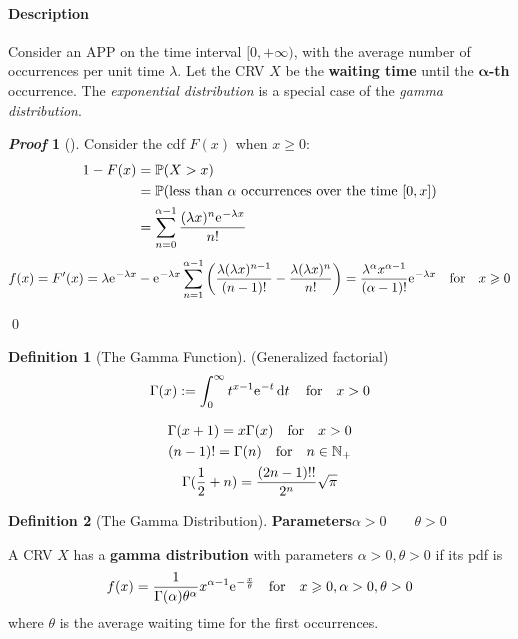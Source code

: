 \documentclass[10pt,UTF8]{article}
\newenvironment{definition box}
{\begin{tcolorbox}[colback=blue!5!white,colframe=blue!75!black,parbox=false,before upper=\par,before lower=\par]}
{\end{tcolorbox}}
\newenvironment{theorem box}
{\begin{tcolorbox}[colback=yellow!5!white,colframe=yellow!75!black,parbox=false,before upper=\par,before lower=\par]}
{\end{tcolorbox}}
\theoremstyle{definition}
\newtheorem{definition inner}{Definition}[section]
\newenvironment{definition}[1][]
{\begin{definition box}\begin{definition inner}[#1]\hfill\par}
{\end{definition inner}\end{definition box}}
\theoremstyle{plain}
\newtheorem{theorem inner}{Theorem}[section]
\theoremstyle{definition}
\newtheorem*{proof inner}{\textit{Proof}}
\renewenvironment{proof}[1][]
{\begin{proof inner}[#1]\hfill\par}
{\qed\end{proof inner}}
\theoremstyle{remark}
\newcommand{\e}{\mathrm{e}{\mkern 1 mu}}
\newcommand{\Prob}{\mathbb{P}\qty}
\begin{document}
\paragraph{Description}
Consider an APP on the time interval $[0,+\infty)$,
with the average number of occurrences per unit time $\lambda$.
Let the CRV $X$ be the \textbf{waiting time}
until the $\bm{\alpha}$\textbf{-th} occurrence.
The \textit{exponential distribution} is a special case of the \textit{gamma distribution}.

\begin{proof}
Consider the cdf $F(x)$ when $x\geqslant 0$:
\begin{align*}
    1 - F(x) &= \Prob(X > x) \\
    &= \Prob(\text{less than $\alpha$ occurrences over the time $[0,x]$}) \\
    &= \sum_{n=0}^{\alpha-1} \frac{(\lambda x)^n \e^{-\lambda x}}{n!}
\end{align*}
\begin{equation*}
    f(x) = F'(x) = 
    \lambda \e^{-\lambda x} -
    \e^{-\lambda x}\sum_{n=1}^{\alpha-1}\left(
        \frac{\lambda(\lambda x)^{n-1}}{(n-1)!} -
        \frac{\lambda(\lambda x)^{n}}{n!}
    \right)
    = \frac{\lambda^\alpha x^{\alpha-1}}{(\alpha-1)!}\e^{-\lambda x}
    \qfor x\geqslant 0
\end{equation*}
    
\end{proof}


\begin{definition}[The Gamma Function]
    (Generalized factorial)
    \begin{equation*}
        \Gamma(x) := \int_{0}^{\infty}t^{x-1}\e^{-t}\dd{t}
        \qfor x>0
    \end{equation*}
\end{definition}

\begin{theorem box}
    \begin{gather*}
        \Gamma(x+1) = x\Gamma(x) \qfor x>0 \\
        (n-1)! = \Gamma(n) \qfor n\in\mathbb{N}_+ \\
        \Gamma(\frac{1}{2}+n) = \frac{(2 n-1)!!}{2^n}\sqrt{\pi}
    \end{gather*}
\end{theorem box}

\begin{definition}[The Gamma Distribution]
    \textbf{Parameters}\qquad $\alpha>0\qquad\theta>0$

    A CRV $X$ has a \textbf{gamma distribution}
    with parameters $\alpha>0,\theta>0$
    if its pdf is
    \begin{equation*}
        f(x) = 
        \frac{1}{\Gamma(\alpha)\theta^\alpha}x^{\alpha-1}\e^{-\frac{x}{\theta}}
        \qfor x\geqslant 0, \alpha>0, \theta>0
    \end{equation*}
where $\theta$ is the average waiting time for the first occurrences.
\end{definition}
\end{document}
